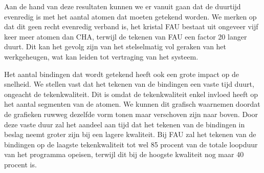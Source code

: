 Aan de hand van deze resultaten kunnen we er vanuit gaan dat de duurtijd evenredig is met het aantal atomen dat moeten getekend worden. We merken op dat dit geen recht evenredig verband is, het kristal FAU bestaat uit ongeveer vijf keer meer atomen dan CHA, terwijl de tekenen van FAU een factor 20 langer duurt. Dit kan het gevolg zijn van het stelselmatig vol geraken van het werkgeheugen, wat kan leiden tot vertraging van het systeem.  
\par
Het aantal bindingen dat wordt getekend heeft ook een grote impact op de snelheid. We stellen vast dat het tekenen van de bindingen een vaste tijd duurt, ongeacht de tekenkwaliteit. Dit is omdat de tekenkwaliteit enkel invloed heeft op het aantal segmenten van de atomen. We kunnen dit grafisch waarnemen doordat de grafieken ruwweg dezelfde vorm tonen maar verschoven zijn naar boven. Door deze vaste duur zal het aandeel aan tijd dat het tekenen van de bindingen in beslag neemt groter zijn bij een lagere kwaliteit. Bij FAU zal het tekenen van de bindingen op de laagste tekenkwaliteit tot wel 85 procent van de totale loopduur van het programma opeisen, terwijl dit bij de hoogste kwaliteit nog maar 40 procent is.

